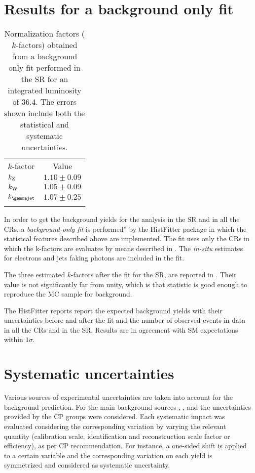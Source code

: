 \section{Results for a background only fit}
\begin{table}[t]
\centering
\begin{tabular}{lc}
\noalign{\smallskip}\toprule\noalign{\smallskip}
$k$-factor&Value\\
\noalign{\smallskip}\midrule\noalign{\smallskip}
$k_{\textup{Z}}$& $1.10\pm0.09$\\
$k_{\textup{W}}$& $1.05\pm0.09$\\
$k_{\textup{\gammajet}}$& $1.07\pm0.25$\\
\noalign{\smallskip}\bottomrule\noalign{\smallskip}
\end{tabular}
\caption{Normalization factors ($k$-factors) obtained from a background only fit performed in the SR for an integrated luminosity of \SI{36.4}{\ifb}. The errors shown include both the statistical and systematic uncertainties.}
\label{tab:kfactors}
\end{table}
In order to get the background yields for the analysis in the SR and in all the CRs, a \emph{background-only fit} is performed'' by the HistFitter package in which the statistcal features described above are implemented. The fit uses only the CRs in which the k-factors are evaluates by means described in \Sect{\ref{sec:kfactor}}. The \emph{in-situ} estimates for electrons and jets faking photons are included in the fit. 

The three estimated $k$-factors after the fit for the SR, are reported in \Tab{\ref{tab:kfactors}}. Their value is not significantly far from unity, which is that statistic is good enough to reproduce the MC sample for background.

The HistFitter \Tab{\ref{table.results.systematics.in.logL.fit.table.results.yields}} reports report the expected background yields with their uncertainties before and after the fit and the number of observed events in data in all the CRs and in the SR. Results are in agreement with SM expectations within $1\sigma$.



\section{Systematic uncertainties}
Various sources of experimental uncertainties are taken into account for the background prediction. For the main background sources \znng, \zg, \wg and \gj the uncertainties provided by the CP groups were considered. Each systematic impact was evaluated considering the corresponding variation by varying the relevant quantity (calibration scale, identification and reconstruction scale factor or efficiency), as per CP recommendation. For instance, a one-sided shift is applied to a certain variable and the corresponding variation on each yield is symmetrized and considered as systematic uncertainty.






